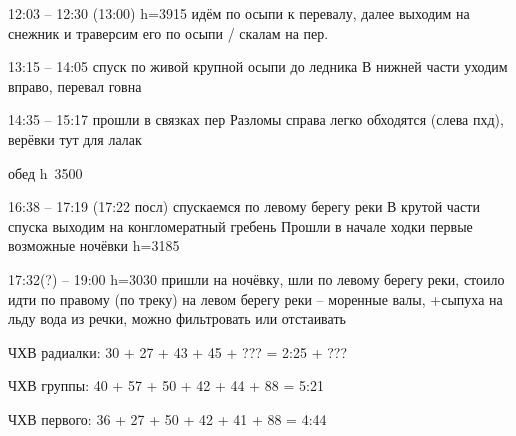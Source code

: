 12:03 -- 12:30 (13:00) h=3915 идём по осыпи к перевалу, далее выходим на снежник и траверсим его по
осыпи / скалам на пер.

13:15 -- 14:05 спуск по живой крупной осыпи до ледника
В нижней части уходим вправо, перевал говна

14:35 -- 15:17 прошли в связках пер
Разломы справа легко обходятся (слева пхд), верёвки тут для лалак

обед h~3500

16:38 -- 17:19 (17:22 посл)
спускаемся по левому берегу реки
В крутой части спуска выходим на конгломератный гребень
Прошли в начале ходки первые возможные ночёвки
h=3185

17:32(?) -- 19:00 h=3030 пришли на ночёвку, шли по левому берегу реки, стоило идти по правому (по треку)
на левом берегу реки -- моренные валы, +сыпуха на льду вода из речки, можно фильтровать или отстаивать


ЧХВ радиалки: 30 + 27 + 43 + 45 + ??? = 2:25 + ???

ЧХВ группы: 40 + 57 + 50 + 42 + 44 + 88 = 5:21

ЧХВ первого: 36 + 27 + 50 + 42 + 41 + 88 = 4:44

    \FloatBarrier
